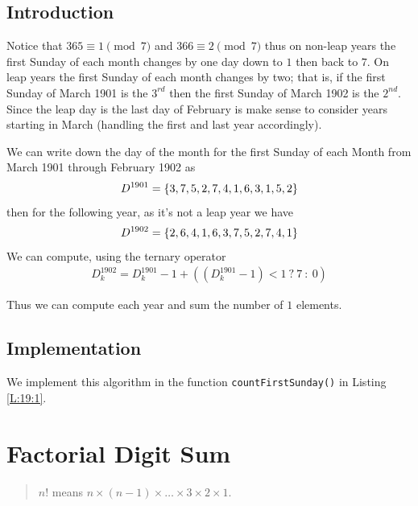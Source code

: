\documentclass[oneside,12pt]{book}   	%
\newcounter{ex}
\theoremstyle{definition}
\newcommand{\set}[1]{\left\{#1\right\}}
\begin{document}
\begin{spacing}{1.618}
		\section{Introduction}
		
			Notice that $365\equiv 1\pmod{7}$ and $366\equiv 2\pmod{7}$ thus on non-leap years the first Sunday of each month changes by one day down to $1$ then back to $7$. On leap years the first Sunday of each month changes by two; that is, if the first Sunday of March 1901 is the $3^{rd}$ then the first Sunday of March 1902 is the $2^{nd}$. Since the leap day is the last day of February is make sense to consider years starting in March (handling the first and last year accordingly).
			
			We can write down the day of the month for the first Sunday of each Month from March 1901 through February 1902 as
			\begin{alignat}{4}
				D^{1901}=\set{3, 7, 5, 2, 7, 4, 1, 6, 3, 1, 5, 2} \notag
			\end{alignat}
			then for the following year, as it's not a leap year we have 
			\begin{alignat}{4}
				D^{1902}=\set{2, 6, 4, 1, 6, 3, 7, 5, 2, 7, 4, 1} \notag 
			\end{alignat}
			We can compute, using the ternary operator 
			\begin{alignat*}{4}
				D^{1902}_{k}= D^{1901}_{k} - 1 + \left( \left(D^{1901}_k -1\right) < 1\ ?\ 7\ :\ 0\right)
			\end{alignat*}
			
			Thus we can compute each year and sum the number of $1$ elements. 
		\section{Implementation}
		
			We implement this algorithm in the function \texttt{countFirstSunday()} in Listing \ref{L:19:1}. 
			
			

	\chapter{Factorial Digit Sum}
	
		\begin{quote}
			$n!$ means $n\times (n-1)\times \dots \times 3 \times 2 \times 1$. 
			

\end{quote}
\end{spacing}
\end{document}
